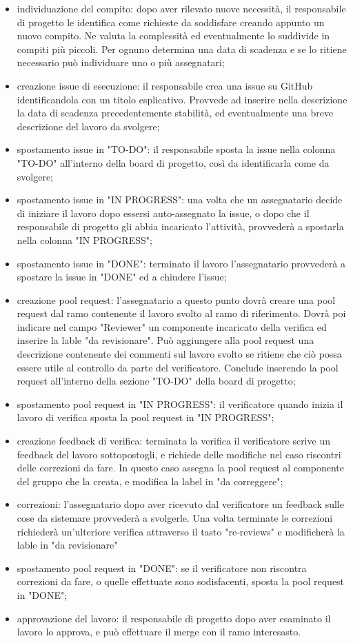\begin{itemize}
    \item individuazione del compito: dopo aver rilevato nuove necessità, il responsabile di progetto le identifica come richieste da soddisfare creando appunto un nuovo compito. Ne valuta la complessità ed eventualmente lo suddivide in compiti più piccoli. Per ognuno determina una data di scadenza e se lo ritiene necessario può individuare uno o più assegnatari;
    \item creazione issue di esecuzione: il responsabile crea una issue su GitHub identificandola con un titolo esplicativo. Provvede ad inserire nella descrizione la data di scadenza precedentemente stabilità, ed eventualmente una breve descrizione del lavoro da svolgere;
    \item spostamento issue in "TO-DO": il responsabile sposta la issue nella colonna "TO-DO" all'interno della board di progetto, così da identificarla come da svolgere;
    \item spostamento issue in "IN PROGRESS": una volta che un assegnatario decide di iniziare il lavoro dopo essersi auto-assegnato la issue, o dopo che il responsabile di progetto gli abbia incaricato l'attività, provvederà a spostarla nella colonna "IN PROGRESS"; 
    \item spostamento issue in "DONE": terminato il lavoro l'assegnatario provvederà a spostare la issue in "DONE" ed a chiudere l'issue;
    \item creazione pool request: l'assegnatario a questo punto dovrà creare una pool request dal ramo contenente il lavoro svolto al ramo di riferimento. Dovrà poi indicare nel campo "Reviewer" un componente incaricato della verifica ed inserire la lable "da revisionare". Può aggiungere alla pool request una descrizione contenente dei commenti sul lavoro svolto se ritiene che ciò possa essere utile al controllo da parte del verificatore. Conclude inserendo la pool request all'interno della sezione "TO-DO" della board di progetto;
    \item spostamento pool request in "IN PROGRESS": il verificatore quando inizia il lavoro di verifica sposta la pool request in "IN PROGRESS";
    \item creazione feedback di verifica: terminata la verifica il verificatore scrive un feedback del lavoro sottopostogli, e richiede delle modifiche nel caso riscontri delle correzioni da fare. In questo caso assegna la pool request al componente del gruppo che la creata, e modifica la label in "da correggere";
    \item correzioni: l'assegnatario dopo aver ricevuto dal verificatore un feedback sulle cose da sistemare provvederà a svolgerle. Una volta terminate le correzioni richiederà un'ulteriore verifica attraverso il tasto "re-reviews" e modificherà la lable in "da revisionare"
    \item spostamento pool request in "DONE": se il verificatore non riscontra correzioni da fare, o quelle effettuate sono sodisfacenti, sposta la pool request in "DONE";
    \item approvazione del lavoro: il responsabile di progetto dopo aver esaminato il lavoro lo approva, e può effettuare il merge con il ramo interesasto.
\end{itemize}
